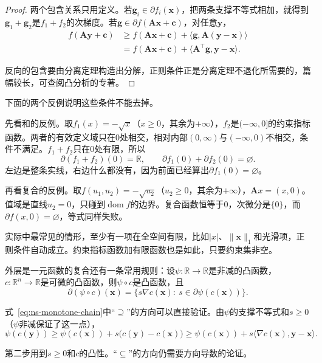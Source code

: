 \begin{proof}
两个包含关系只用定义。若$\bm{g}_i\in\partial f_i(\bm{x})$，把两条支撑不等式相加，就得到$\bm{g}_1+\bm{g}_2$是$f_1+f_2$的次梯度。若$\bm{g}\in\partial f(\bm{A}\bm{x}+\bm{c})$，对任意$\bm{y}$，
\[
 \begin{aligned}
 f(\bm{A}\bm{y}+\bm{c})&\geq f(\bm{A}\bm{x}+\bm{c})+\langle\bm{g},\bm{A}(\bm{y}-\bm{x})\rangle\\
 &=f(\bm{A}\bm{x}+\bm{c})+\langle\bm{A}^\top\bm{g},\bm{y}-\bm{x}\rangle.
 \end{aligned}
\]

反向的包含要由分离定理构造出分解，正则条件正是分离定理不退化所需要的，篇幅较长，可查阅凸分析的专著。
\end{proof}

下面的两个反例说明这些条件不能去掉。

先看和的反例。取$f_1(x)=-\sqrt{x}$（$x\geq0$，其余为$+\infty$），$f_2$是$(-\infty,0]$的约束指标函数。两者的有效定义域只在$0$处相交，相对内部$(0,\infty)$与$(-\infty,0)$不相交，条件不满足。$f_1+f_2$只在$0$处有限，所以
\[
 \partial(f_1+f_2)(0)=\mathbb{R},\qquad\partial f_1(0)+\partial f_2(0)=\varnothing.
\]
左边是整条实线，右边什么都没有，因为前面已经算出$\partial f_1(0)=\varnothing$。

再看复合的反例。取$f(u_1,u_2)=-\sqrt{u_2}$（$u_2\geq0$，其余为$+\infty$），$\bm{A}x=(x,0)$。值域是直线$u_2=0$，只碰到$\operatorname{dom}f$的边界。复合函数恒等于$0$，次微分是$\{0\}$，而$\partial f(x,0)=\varnothing$，等式同样失败。

实际中最常见的情形，至少有一项在全空间有限，比如$\lvert x\rvert$、$\lVert\bm{x}\rVert_1$和光滑项，正则条件自动成立。约束指标函数加有限函数也是如此，只要约束集非空。

外层是一元函数的复合还有一条常用规则：设$\psi:\mathbb{R}\to\mathbb{R}$是非减的凸函数，$c:\mathbb{R}^n\to\mathbb{R}$是可微的凸函数，则$\psi\circ c$是凸函数，且
\begin{equation}
 \partial(\psi\circ c)(\bm{x})=\bigl\{s\nabla c(\bm{x}):\ s\in\partial\psi(c(\bm{x}))\bigr\}.
 \label{eq:ns-monotone-chain}
\end{equation}

式~\eqref{eq:ns-monotone-chain}中“$\supseteq$”的方向可以直接验证。由$\psi$的支撑不等式和$s\geq0$（$\psi$非减保证了这一点），
\[
 \psi(c(\bm{y}))\geq\psi(c(\bm{x}))+s\bigl(c(\bm{y})-c(\bm{x})\bigr)\geq\psi(c(\bm{x}))+s\langle\nabla c(\bm{x}),\bm{y}-\bm{x}\rangle.
\]

第二步用到$s\geq0$和$c$的凸性。“$\subseteq$”的方向仍需要方向导数的论证。

